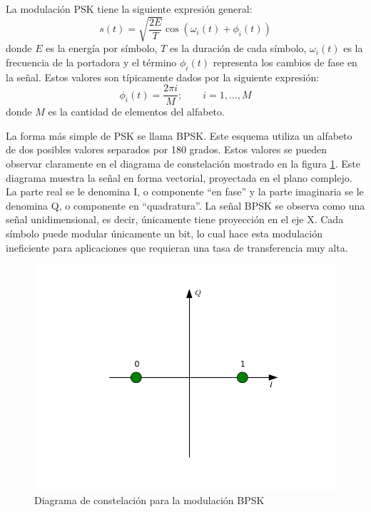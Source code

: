 La modulaci\'on PSK tiene la siguiente expresi\'on general:
\begin{equation}\label{eq:pskgen}
s(t)=\sqrt{\frac{2E}{T}}\cos(\omega_i(t)+\phi_i(t))
\end{equation}
donde $E$ es la energ\'ia por s\'imbolo, $T$ es la duraci\'on de cada s\'imbolo,
$\omega_i(t)$ es la frecuencia de la portadora y el t\'ermino $\phi_i(t)$
representa los cambios de fase en la se\~nal. Estos valores son t\'ipicamente
dados por la siguiente expresi\'on:
\begin{equation}\label{eq:levelfase}
\phi_i(t)=\frac{2\pi i}{M}; \qquad i=1,\ldots,M 
\end{equation}
donde $M$ es la cantidad de elementos del alfabeto.

La forma m\'as simple de PSK se llama BPSK. Este esquema utiliza un alfabeto de
dos posibles valores separados por 180 grados. Estos valores se pueden observar
claramente en el diagrama de constelaci\'on mostrado en la figura
\ref{fig:bpskconst}. Este diagrama muestra la se\~nal en forma vectorial,
proyectada en el plano complejo. La parte real se le denomina I, o componente ``en fase'' y
la parte imaginaria se le denomina Q, o componente en ``quadratura''. La se\~nal
BPSK se observa como una se\~nal unidimensional, es decir, \'unicamente tiene
proyecci\'on en el eje X. Cada s\'imbolo puede modular \'unicamente un bit, lo
cual hace esta modulaci\'on ineficiente para aplicaciones que requieran una tasa
de transferencia muy alta.
\begin{figure}[hpt]
\centering
	\includegraphics[width=5.5in]{figs/bpsk}
	\caption{Diagrama de constelaci\'on para la modulaci\'on BPSK}
	\label{fig:bpskconst}
\end{figure}


